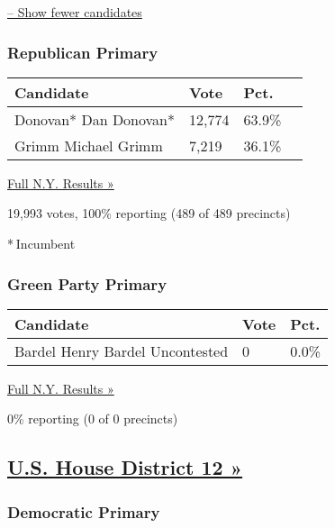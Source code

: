 \protect\hyperlink{}{-- Show fewer candidates}

\hypertarget{republican-primary-7}{%
\subsubsection{Republican Primary}\label{republican-primary-7}}

\begin{longtable}[]{@{}llll@{}}
\toprule
Candidate & Vote & Pct. &\tabularnewline
\midrule
\endhead
 Donovan* Dan Donovan* & 12,774 & 63.9\% &\tabularnewline
 Grimm Michael Grimm & 7,219 & 36.1\% &\tabularnewline
\bottomrule
\end{longtable}

\href{https://www.nytimes3xbfgragh.onion/elections/results/new-york}{Full
N.Y. Results »}

19,993 votes, 100\% reporting (489 of 489 precincts)

* Incumbent

\hypertarget{green-party-primary-1}{%
\subsubsection{Green Party Primary}\label{green-party-primary-1}}

\begin{longtable}[]{@{}lll@{}}
\toprule
Candidate & Vote & Pct.\tabularnewline
\midrule
\endhead
 Bardel Henry Bardel Uncontested & 0 & 0.0\%\tabularnewline
\bottomrule
\end{longtable}

\href{https://www.nytimes3xbfgragh.onion/elections/results/new-york}{Full
N.Y. Results »}

0\% reporting (0 of 0 precincts)

\hypertarget{us-house-district-12-}{%
\subsection{\texorpdfstring{\href{https://www.nytimes3xbfgragh.onion/elections/results/new-york-house-district-12-primary-election}{U.S.
House District 12
»}}{U.S. House District 12 »}}\label{us-house-district-12-}}

\hypertarget{democratic-primary-12}{%
\subsubsection{Democratic Primary}\label{democratic-primary-12}}

